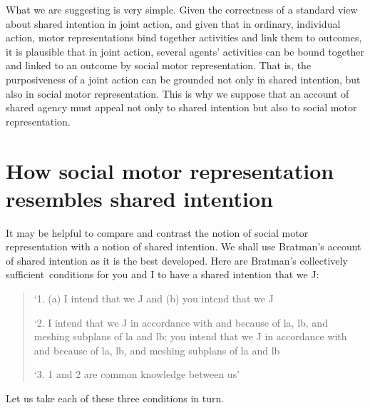 \documentclass[12pt,\papersize]{extarticle}
\begin{document}

What we are suggesting is very simple.
Given the correctness of a standard view about shared intention in joint action, 
and 
given that in ordinary, individual action, motor representations  bind together activities and link them to outcomes,
it is plausible that 
in joint action, several agents' activities can be bound together and linked to an outcome by social motor representation.
That is,
the purposiveness of a joint action can be grounded not only in shared intention, but also in social motor representation.
This is why we suppose that an account of shared agency must appeal not only to shared intention but also to social motor representation.


\section{How social motor representation resembles shared intention}
It may be helpful to compare and contrast the notion of social motor representation with a notion of shared intention. 
We shall use Bratman's account of shared intention as it is the best developed. 
Here are Bratman’s collectively sufficient\footnotemark \ conditions for you and I to have a shared intention that we J:
%
%
\begin{quote}
\label{quote:bratman_account}
`1. (a) I intend that we J and (b) you intend that we J
 
`2. I intend that we J in accordance with and because of la, lb, and meshing subplans of la and lb; you intend that we J in accordance with and because of la, lb, and meshing subplans of la and lb
 
`3. 1 and 2 are common knowledge between us' \citep[][p.\ View 4]{Bratman:1993je}
\end{quote}
%
Let us take each of these three conditions in turn.
\end{document}
